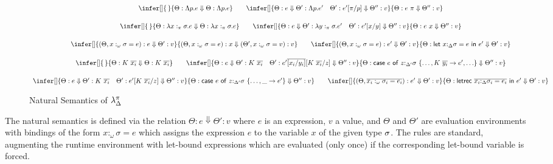 \documentclass[acmsmall,review,screen]{acmart}
\newcommand{\llet}[2]{\mathsf{let}~#1~\mathsf{in}~#2}
\newcommand{\lletrec}[2]{\mathsf{letrec}~#1~\mathsf{in}~#2}
\newcommand{\ccase}[2]{\mathsf{case}~#1~\mathsf{of}~#2}
\begin{document}
\begin{figure}

  {\small
    \[
  \begin{array}{c}
    \infer[]
    {\,}
    {\Theta : \Lambda p.e \Downarrow \Theta : \Lambda p.e}
    \qquad
    \infer[]
    {\Theta : e\Downarrow \Theta' : \Lambda p.e' \quad \Theta' :
    e'[\pi/p]\Downarrow \Theta'' : v}
    {\Theta : e~\pi\Downarrow \Theta'' : v }\\[1.5em]
    \infer[]
    {\,}
    {\Theta : \lambda x:_\pi \sigma . e \Downarrow \Theta : \lambda x:_\pi \sigma . e }
    \qquad
    \infer[]
    {\Theta : e \Downarrow \Theta' : \lambda y:_\pi \sigma . e' \quad
    \Theta' : e'[x/y] \Downarrow \Theta'' : v }
    {\Theta : e~x \Downarrow \Theta'' : v}\\[1.5em]
    \infer[]
    {(\Theta,  x:_\omega \sigma = e) : e \Downarrow \Theta' : v}
    {(\Theta , x:_\omega \sigma = e) : x \Downarrow (\Theta',x:_\omega
    \sigma = v) : v}
    \qquad
    \infer[]
    {(\Theta,x:_\omega \sigma = e) : e' \Downarrow \Theta' : v}
    {\Theta : \llet{x{:}_{\Delta}\sigma = e}{e'}\Downarrow \Theta' : v
    }\\[1.5em]
    \infer[]
    {\,}
    {\Theta : K~\ov{x_i} \Downarrow \Theta : K~\ov{x_i}}
    \qquad
    \infer[]
    {\Theta : e \Downarrow \Theta' : K~\ov{x_i} \quad
    \Theta' : e'\ov{[x_i/y_i]}[K~\ov{x_i}/z] \Downarrow \Theta'' : v }
    {\Theta :
    \ccase{e}{z{:}_{\Delta'}\sigma~\{{\dots,K~\ov{y_i} \to e', {\dots}}\}}
    \Downarrow \Theta'' : v}\\[1.5em]
    \infer[]
    {\Theta : e \Downarrow \Theta' : K~\ov{x_i} \quad
    \Theta' : e'[K~\ov{x_i}/z] \Downarrow \Theta'' : v }
    {\Theta :
    \ccase{e}{z{:}_{\Delta'}\sigma~\{\dots , \_\to
    e'}\} \Downarrow \Theta'' : v}
    \qquad
    \infer[]
    {%
    (\Theta, \overline{x_i:_\omega \sigma_i = e_i}) : e' \Downarrow \Theta'
    : v
    }
    {\Theta : \lletrec{\overline{x_i{:}_{\Delta}\sigma_i = e_i}}{e'}
    \Downarrow \Theta' : v}
    \end{array}
\]}
    \caption{Natural Semantics of $\lambda^\pi_\Delta$\label{fig:opsem}}
  \end{figure}

  The natural semantics is defined via the relation
$\Theta : e \Downarrow \Theta' : v$ where $e$ is an expression, $v$ a
value, and $\Theta$ and $\Theta'$ are evaluation environments with bindings of
the form $x:_\omega\sigma = e$ which assigns the expression $e$ to the variable
$x$ of the given type $\sigma$. The rules are standard, augmenting the runtime
environment with let-bound expressions which are evaluated (only once) if the
corresponding let-bound variable is forced.
\end{document}
